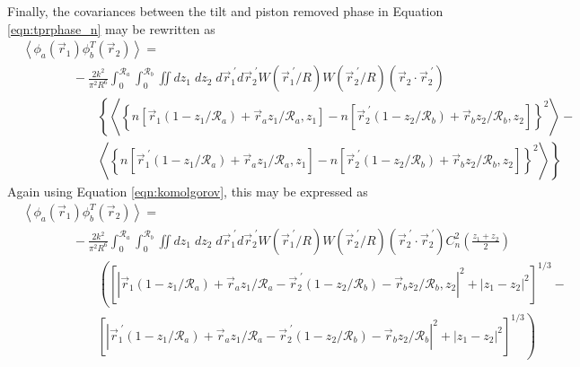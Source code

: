 Finally, the covariances between the tilt and piston removed phase in Equation \ref{eqn:tprphase_n} may be rewritten as 
\begin{equation}\label{eqn:tprphase_n2}
\begin{aligned}
&\left\langle \phi_{a}\left(\vec{r}_{1}\right) \phi^{T}_{b}\left(\vec{r}_{2}\right)\right\rangle = \\
&\quad\quad\quad\quad
-\frac{2k^{2}}{\pi^{2}R^{6}} \int_{0}^{\mathcal{R}_{a}}  \int_{0}^{\mathcal{R}_{b}} \iint dz_{1} \; dz_{2} \; d\vec{r}^{\;\prime}_{1}d\vec{r}^{\;\prime}_{2} W(\vec{r}^{\;\prime}_{1}/R) W(\vec{r}^{\;\prime}_{2}/R)
\left(\vec{r}_{2} \cdot \vec{r}^{\;\prime}_{2}\right)
\\
&\quad\quad\quad\quad\quad\quad
\left\{
\left\langle \left\{n\left[\vec{r}_{1}\left(1-z_{1}/\mathcal{R}_{a}\right) + \vec{r}_{a} z_{1}/\mathcal{R}_{a}, z_{1}\right] -
 n\left[\vec{r}^{\;\prime}_{2}\left(1-z_{2}/\mathcal{R}_{b}\right) + \vec{r}_{b} z_{2}/\mathcal{R}_{b}, z_{2}\right] \right\}^{2}\right\rangle 
\right. -
\\
&\quad\quad\quad\quad\quad\quad
\left.
\left\langle \left\{ n\left[\vec{r}^{\;\prime}_{1}\left(1-z_{1}/\mathcal{R}_{a}\right) + \vec{r}_{a} z_{1}/\mathcal{R}_{a}, z_{1}\right]- 
 n\left[\vec{r}^{\;\prime}_{2}\left(1-z_{2}/\mathcal{R}_{b}\right) + \vec{r}_{b} z_{2}/\mathcal{R}_{b}, z_{2}\right] \right\}^{2}\right\rangle
\right\}
\end{aligned}
\end{equation}
Again using Equation \ref{eqn:komolgorov}, this may be expressed as
\begin{equation}\label{eqn:tprphase_n3}
\begin{aligned}
&\left\langle \phi_{a}\left(\vec{r}_{1}\right) \phi^{T}_{b}\left(\vec{r}_{2}\right)\right\rangle = \\
&\quad\quad\quad\quad
-\frac{2k^{2}}{\pi^{2}R^{6}} \int_{0}^{\mathcal{R}_{a}}  \int_{0}^{\mathcal{R}_{b}} \iint dz_{1} \; dz_{2} \; d\vec{r}^{\;\prime}_{1}d\vec{r}^{\;\prime}_{2} W(\vec{r}^{\;\prime}_{1}/R) W(\vec{r}^{\;\prime}_{2}/R)
\left(\vec{r}^{\;\prime}_{2} \cdot \vec{r}^{\;\prime}_{2}\right)
C_{n}^{2}\left(\frac{z_{1} + z_{2}}{2}\right) 
\\
&\quad\quad\quad\quad\quad\quad
\left(
\left[\left\vert \vec{r}_{1}\left(1-z_{1}/\mathcal{R}_{a}\right) + \vec{r}_{a} z_{1}/\mathcal{R}_{a} - \vec{r}^{\;\prime}_{2}\left(1-z_{2}/\mathcal{R}_{b}\right) - \vec{r}_{b} z_{2}/\mathcal{R}_{b}, z_{2}\right\vert^{2}   + 
\left\vert z_{1} - z_{2} \right\vert^{2}\right]^{1/3}
\right. -
\\
&\quad\quad\quad\quad\quad\quad
\left.
\left[ \left\vert \vec{r}^{\;\prime}_{1}\left(1-z_{1}/\mathcal{R}_{a}\right) + \vec{r}_{a} z_{1}/\mathcal{R}_{a} - 
 \vec{r}^{\;\prime}_{2}\left(1-z_{2}/\mathcal{R}_{b}\right) - \vec{r}_{b} z_{2}/\mathcal{R}_{b}\right\vert^{2} + 
\left\vert z_{1} - z_{2} \right\vert^{2}\right]^{1/3}
\right)
\end{aligned}
\end{equation}

